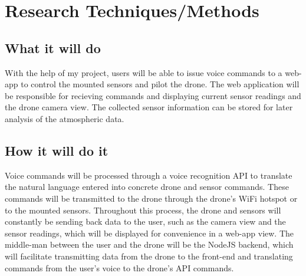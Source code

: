 \documentclass{article}
\begin{document}
	\section{Research Techniques/Methods}
	\subsection{What it will do}
	With the help of my project, users will be able to issue voice commands to a web-app to control the mounted sensors and pilot the drone. The web application will be responsible for recieving commands and displaying current sensor readings and the drone camera view. The collected sensor information can be stored for later analysis of the atmospheric data. 
	\subsection{How it will do it}
	Voice commands will be processed through a voice recognition API to translate the natural language entered into concrete drone and sensor commands. These commands will be transmitted to the drone through the drone's WiFi hotspot or to the mounted sensors. Throughout this process, the drone and sensors will constantly be sending back data to the user, such as the camera view and the sensor readings, which will be displayed for convenience in a web-app view. The middle-man between the user and the drone will be the NodeJS backend, which will facilitate transmitting data from the drone to the front-end and translating commands from the user's voice to the drone's API commands.  
\end{document}
